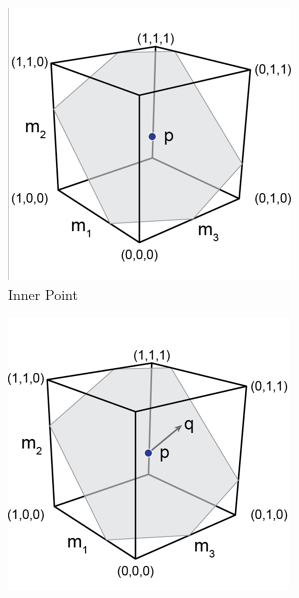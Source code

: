 \begin{figure}
        \centering
        \begin{subfigure}[b]{0.25\textwidth}
                \includegraphics[width=\textwidth]{HR2.png}
                 \caption{Inner Point}
      						\label{fig_hr1}
        \end{subfigure} \hspace{0.5cm}
        \begin{subfigure}[b]{0.25\textwidth}
                \includegraphics[width=\textwidth]{HR3.png}

\end{subfigure}
\end{figure}
